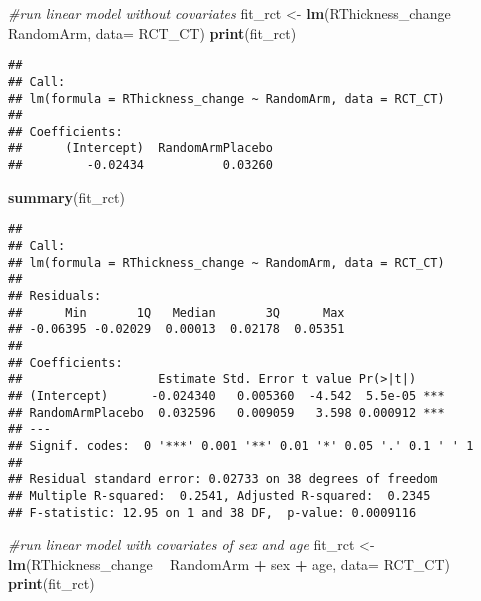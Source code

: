 \documentclass[]{article}
\newenvironment{Shaded}{\begin{snugshade}}{\end{snugshade}}
\newcommand{\KeywordTok}[1]{\textcolor[rgb]{0.13,0.29,0.53}{\textbf{#1}}}
\newcommand{\DataTypeTok}[1]{\textcolor[rgb]{0.13,0.29,0.53}{#1}}
\newcommand{\StringTok}[1]{\textcolor[rgb]{0.31,0.60,0.02}{#1}}
\newcommand{\CommentTok}[1]{\textcolor[rgb]{0.56,0.35,0.01}{\textit{#1}}}
\newcommand{\OperatorTok}[1]{\textcolor[rgb]{0.81,0.36,0.00}{\textbf{#1}}}
\newcommand{\NormalTok}[1]{#1}
\theoremstyle{definition}
\theoremstyle{definition}
\theoremstyle{definition}
\theoremstyle{remark}
\begin{document}
\begin{Shaded}
\begin{Highlighting}[]
\CommentTok{#run linear model without covariates}
\NormalTok{  fit_rct <-}\StringTok{ }\KeywordTok{lm}\NormalTok{(RThickness_change }\OperatorTok{~}\StringTok{ }\NormalTok{RandomArm, }\DataTypeTok{data=}\NormalTok{ RCT_CT)}
  \KeywordTok{print}\NormalTok{(fit_rct)}
\end{Highlighting}
\end{Shaded}

\begin{verbatim}
## 
## Call:
## lm(formula = RThickness_change ~ RandomArm, data = RCT_CT)
## 
## Coefficients:
##      (Intercept)  RandomArmPlacebo  
##         -0.02434           0.03260
\end{verbatim}

\begin{Shaded}
\begin{Highlighting}[]
  \KeywordTok{summary}\NormalTok{(fit_rct)}
\end{Highlighting}
\end{Shaded}

\begin{verbatim}
## 
## Call:
## lm(formula = RThickness_change ~ RandomArm, data = RCT_CT)
## 
## Residuals:
##      Min       1Q   Median       3Q      Max 
## -0.06395 -0.02029  0.00013  0.02178  0.05351 
## 
## Coefficients:
##                   Estimate Std. Error t value Pr(>|t|)    
## (Intercept)      -0.024340   0.005360  -4.542  5.5e-05 ***
## RandomArmPlacebo  0.032596   0.009059   3.598 0.000912 ***
## ---
## Signif. codes:  0 '***' 0.001 '**' 0.01 '*' 0.05 '.' 0.1 ' ' 1
## 
## Residual standard error: 0.02733 on 38 degrees of freedom
## Multiple R-squared:  0.2541, Adjusted R-squared:  0.2345 
## F-statistic: 12.95 on 1 and 38 DF,  p-value: 0.0009116
\end{verbatim}

\begin{Shaded}
\begin{Highlighting}[]
\CommentTok{#run linear model with covariates of sex and age}
\NormalTok{  fit_rct <-}\StringTok{ }\KeywordTok{lm}\NormalTok{(RThickness_change }\OperatorTok{~}\StringTok{ }\NormalTok{RandomArm }\OperatorTok{+}\StringTok{ }\NormalTok{sex }\OperatorTok{+}\StringTok{ }\NormalTok{age, }\DataTypeTok{data=}\NormalTok{ RCT_CT)}
  \KeywordTok{print}\NormalTok{(fit_rct)}
\end{Highlighting}
\end{Shaded}
\end{document}
